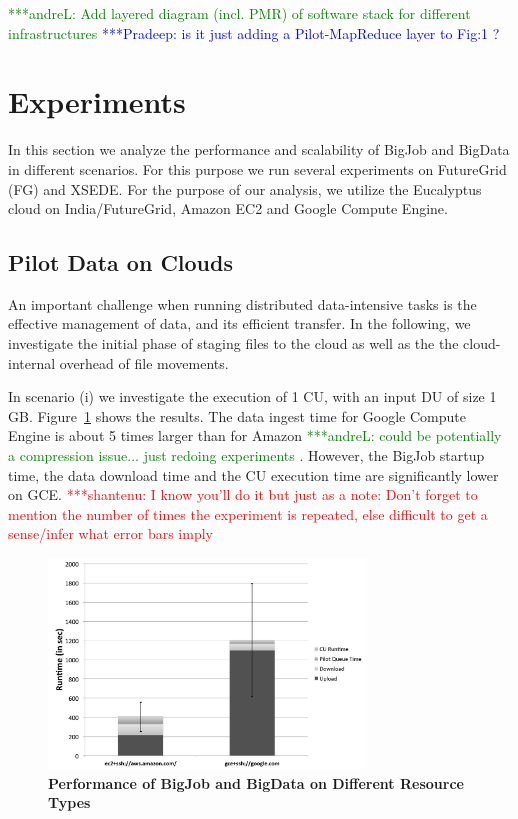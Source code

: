 \documentclass[times]{cpeauth}
\newcommand{\jhanote}[1]{ {\textcolor{red} { ***shantenu: #1 }}}
\newcommand{\alnote}[1]{ {\textcolor{green} { ***andreL: #1 }}}
\newcommand{\pmnote}[1]{ {\textcolor{blue} { ***Pradeep: #1 }}}
\newcommand{\alnote}[1]{}
\newcommand{\pmnote}[1]{}
\newcommand{\jhanote}[1]{}
\newcommand{\du}{DU\xspace}
\newcommand{\cu}{CU\xspace}
\begin{document}
\alnote{Add layered diagram (incl. PMR) of software stack for different 
infrastructures}
\pmnote{ is it just adding a Pilot-MapReduce layer to Fig:1 ? }

\section{Experiments}

In this section we analyze the performance and scalability of BigJob and 
BigData in different scenarios. For this purpose we run several experiments on 
FutureGrid (FG) and XSEDE. For the purpose of our analysis, we utilize the 
Eucalyptus cloud on India/FutureGrid, Amazon EC2 and Google Compute Engine.

	
\subsection{Pilot Data on Clouds}

An important challenge when running distributed data-intensive tasks is the 
effective management of data, and its efficient transfer. In the following, we 
investigate the initial phase of staging files to the cloud as well as the 
the cloud-internal overhead of file movements.

In scenario (i) we investigate the execution of 1 \cu, with an input
\du of size 1\,GB. Figure~\ref{fig:performance_pd_google_aws} shows
the results. The data ingest time for Google Compute Engine is about 5
times larger than for Amazon \alnote{could be potentially a
  compression issue... just redoing experiments}.  However, the BigJob
startup time, the data download time and the \cu execution time are
significantly lower on GCE. \jhanote{I know you'll do it but just as a
  note: Don't forget to mention the number of times the experiment is
  repeated, else difficult to get a sense/infer what error bars imply}
\begin{figure}[htbp]
	\centering
		\includegraphics[width=0.75\textwidth]{performance/pd_google_aws.pdf}
	\caption{\textbf{Performance of BigJob and BigData on Different Resource Types}}
	\label{fig:performance_pd_google_aws}
\end{figure}
\end{document}
